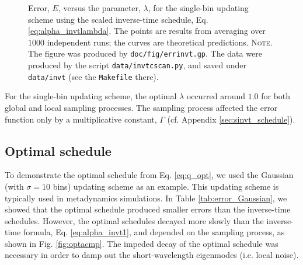\documentclass[reprint, superscriptaddress, floatfix]{revtex4-1}
\newcommand{\note}[1]{{\color{DarkGreen}\footnotesize \textsc{Note.} #1}}
\newcommand{\Err}{E}
\begin{document}
\begin{figure}[h]
\begin{center}
  \caption{
    \label{fig:errinvt}
    Error, $\Err$, versus the parameter, $\lambda$,
    for the single-bin updating scheme
    using the scaled inverse-time schedule,
    Eq. \eqref{eq:alpha_invtlambda}.
    The points are results from averaging over $1000$ independent runs;
    the curves are theoretical predictions.
    \note{The figure was produced by \texttt{doc/fig/errinvt.gp}.
      The data were produced by the script \texttt{data/invtcscan.py},
      and saved under \texttt{data/invt}
      (see the \texttt{Makefile} there).
    }%
  }
\end{center}
\end{figure}

For the single-bin updating scheme,
the optimal $\lambda$ occurred around $1.0$
for both global and local sampling processes.
%
The sampling process affected the error function
only by a multiplicative constant, $\Gamma$
(cf. Appendix \ref{sec:sinvt_schedule}).
%




\subsection{\label{sec:results_optschedule}
Optimal schedule}



To demonstrate the optimal schedule from Eq. \eqref{eq:q_opt},
we used the Gaussian (with $\sigma = 10$ bins) updating scheme
as an example.
%
This updating scheme is typically used in metadynamics simulations.
%
In Table \ref{tab:error_Gaussian},
we showed that the optimal schedule
produced smaller errors than
the inverse-time schedules.
%
However, the optimal schedules
decayed more slowly than
the inverse-time formula, Eq. \eqref{eq:alpha_invt1},
and depended on the sampling process,
as shown in Fig. \ref{fig:optacmp}.
%
The impeded decay of the optimal schedule
was necessary in order to
damp out the short-wavelength eigenmodes
(i.e. local noise).
%
\end{document}
